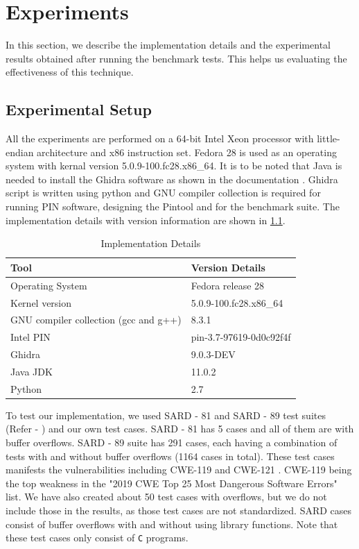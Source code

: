 
\chapter{Experiments}
In this section, we describe the implementation details and the experimental results obtained after running the benchmark tests. This helps us evaluating the effectiveness of this technique.

\section{Experimental Setup}
All the experiments are performed on a 64-bit Intel Xeon processor with little-endian architecture and x86 instruction set. Fedora 28 is used as an operating system with kernal version 5.0.9-100.fc28.x86\_64. It is to be noted that Java is needed to install the Ghidra software as shown in the documentation \citep{ghidrainstallation}. Ghidra script is written using python and GNU compiler collection is required for running PIN software, designing the Pintool and for the benchmark suite. The implementation details with version information are shown in \cref{tab:table41}.\\
\begin{table}[ht]
\centering\small
\begin{tabularx}{\linewidth}{lX}
\toprule
Tool & Version Details\\
\midrule
Operating System & Fedora release 28\\
Kernel version & 5.0.9-100.fc28.x86\_64\\
GNU compiler collection (gcc and g++) & 8.3.1\\
Intel PIN & pin-3.7-97619-0d0c92f4f\\
Ghidra & 9.0.3-DEV\\
Java JDK & 11.0.2\\
Python & 2.7\\
\bottomrule
\end{tabularx}
\caption{Implementation Details\label{tab:table41}}
\end{table}

To test our implementation, we used SARD - 81 and SARD - 89 test suites (Refer - \citep{black2017sard} \citep{sardcite}) and our own test cases. SARD - 81 has 5 cases and all of them are with buffer overflows. SARD - 89 suite has 291 cases, each having a combination of tests with and without buffer overflows (1164 cases in total). These test cases manifests the vulnerabilities including CWE-119 \citep{cwe119} and CWE-121 \citep{cwe121}. CWE-119 being the top weakness in the "2019 CWE Top 25 Most Dangerous Software Errors"\citep{2019cwetop25} list. We have also created about 50 test cases with overflows, but we do not include those in the results, as those test cases are not standardized. SARD cases consist of buffer overflows with and without using library functions. Note that these test cases only consist of \texttt{C} programs.

